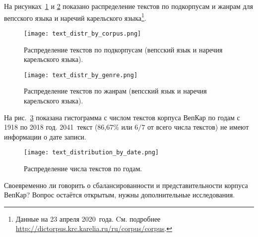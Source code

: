 На рисунках~\ref{fig:text_distr_by_corpus} и \ref{fig:text_distr_by_genre} 
показано распределение текстов по подкорпусам и жанрам для вепсского языка 
и наречий карельского языка\footnote{Данные 
                                     на 23 апреля 2020~года. Cм. подробнее 
			\href{http://dictorpus.krc.karelia.ru/ru/corpus/corpus}{http://dictorpus.krc.karelia.ru/ru/corpus/corpus}.}.

\begin{figure}
    \centering
    \texttt{[image: text\_distr\_by\_corpus.png]}
    \caption[Распределение текстов по подкорпусам]{Распределение текстов по подкорпусам (вепсский язык и наречия карельского языка).}
    \label{fig:text_distr_by_corpus}
\end{figure}

\begin{figure}
    \centering
    \texttt{[image: text\_distr\_by\_genre.png]}
    \caption[Распределение текстов по жанрам]{Распределение текстов по жанрам (вепсский язык и наречия карельского языка).}
    \label{fig:text_distr_by_genre}
\end{figure}

На рис.~\ref{fig:text_distribution_by_date} показана гистограмма 
с числом текстов корпуса ВепКар по годам с 1918 по 2018 год. 
2041~текст (86,67\% или $6/7$ от всего числа текстов) не имеют информации о дате записи.
\begin{figure}
    \centering
    \texttt{[image: text\_distribution\_by\_date.png]}
    \caption{Распределение числа текстов по годам.}
    \label{fig:text_distribution_by_date}
\end{figure}

Своевременно ли говорить о сбалансированности и представительности корпуса ВепКар? Вопрос остаётся открытым, нужны дополнительные исследования.


